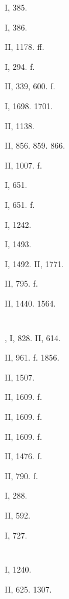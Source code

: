  I, 385.

 I, 386.

 II, 1178. ff.

 I, 294. f.

 II, 339, 600. f.

 I, 1698. 1701.

 II, 1138.

 II, 856. 859. 866.

 II, 1007. f.

 I, 651.

 I, 651. f.

 I, 1242.

 I, 1493.

 I, 1492. II, 1771.

 II, 795. f.

 II, 1440. 1564.

\section{}

,  I, 828. II, 614.

 II, 961. f. 1856.

 II, 1507.

 II, 1609. f.

 II, 1609. f.

 II, 1609. f.

 II, 1476. f.

 II, 790. f.

 I, 288.

 II, 592.

 I, 727.

\section{}

 I, 1240.

 II, 625. 1307.


